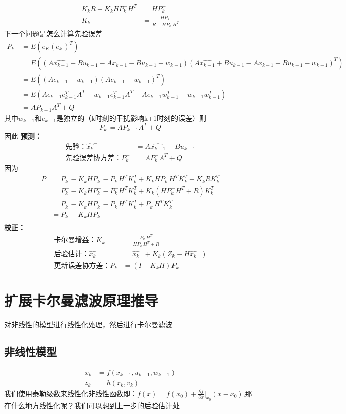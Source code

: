 \documentclass[12pt, a4paper, oneside]{ctexbook}
\begin{document}
\begin{align*}
    K_kR+K_kHP_k^-H^T&=HP_k^-\\
    K_k&=\frac{HP_k^-}{R+HP_k^-H^T}
\end{align*}
下一个问题是怎么计算先验误差
\begin{align*}
P_k^-&=E(e_K^-(e_k^-)^T)\\
     &=E((A\hat{x_{k-1}}+Bu_{k-1}-Ax_{k-1}-Bu_{k-1}-w_{k-1})(A\hat{x_{k-1}}+Bu_{k-1}-Ax_{k-1}-Bu_{k-1}-w_{k-1})^T)\\
     &=E((Ae_{k-1}-w_{k-1})(Ae_{k-1}-w_{k-1})^T)\\
     &=E(Ae_{k-1}e_{k-1}^TA^T-w_{k-1}e_{k-1}^TA^T-Ae_{k-1}w_{k-1}^T+w_{k-1}w_{k-1}^T)\\
     &=AP_{k-1}A^T+Q
\end{align*}
其中$w_{k-1}$和$e_{k-1}$是独立的（k时刻的干扰影响k+1时刻的误差）则
\begin{equation*}
P_k^-=AP_{k-1}A^T+Q
\end{equation*}
因此
\textbf{预测：}
\begin{align*}
    \text{先验：}\hat{x_k}^-&=A\hat{x_{k-1}}+Bu_{k-1}\\
    \text{先验误差协方差：}P_k^-&=AP_k^-A^T+Q
\end{align*}
因为
\begin{align*}
    P&=P_k^--K_kHP_k^--P_k^-H^TK_k^T+K_kHP_k^-H^TK_k^T+K_kRK_k^T\\
     &=P_k^--K_kHP_k^--P_k^-H^TK_k^T+K_k(HP_k^-H^T+R)K_k^T\\
     &=P_k^--K_kHP_k^--P_k^-H^TK_k^T+P_k^-H^TK_k^T\\
     &=P_k^--K_kHP_k^-\\
\end{align*}
\textbf{校正：}
\begin{align*}
    \text{卡尔曼增益：}K_k&=\frac{P_k^-H^T}{HP_k^-H^T+R}\\
    \text{后验估计：}\hat{x_k}&=\hat{x_k}^-+K_k(Z_k-H\hat{x_k}^-)\\
    \text{更新误差协方差：}P_k&=(I-K_kH)P_k^-
\end{align*}
\chapter{扩展卡尔曼滤波原理推导}
对非线性的模型进行线性化处理，然后进行卡尔曼滤波
\section{非线性模型}
\begin{align*}
    x_k&=f(x_{k-1},u_{k-1},w_{k-1})\\
    z_k&=h(x_k,v_k)
\end{align*}
我们使用泰勒级数来线性化非线性函数即：$ f(x)=f(x_0)+\frac{\partial f}{\partial x}|_{x_0}(x-x_0) $,那在什么地方线性化呢？我们可以想到上一步的后验估计处
\end{document}
